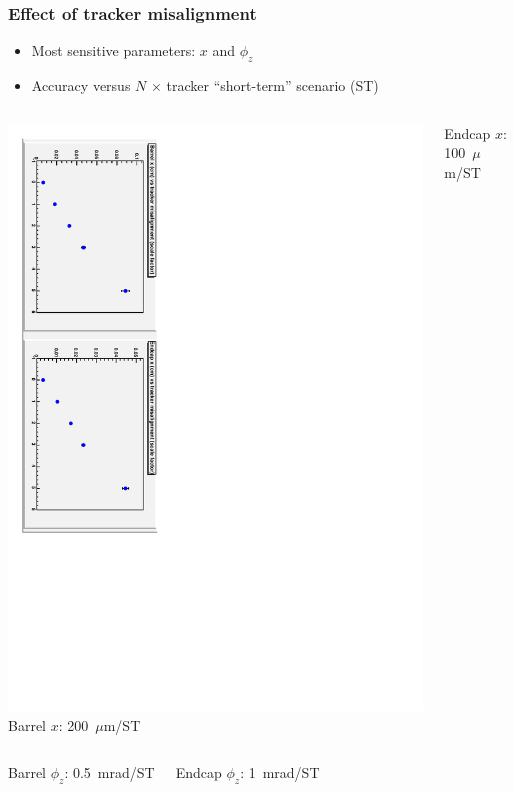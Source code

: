 \documentclass[compress]{beamer}
\begin{document}
\begin{frame}
\frametitle{Effect of tracker misalignment}
\begin{itemize}
\item Most sensitive parameters: $x$ and $\phi_z$
\item Accuracy versus $N$ $\times$ tracker ``short-term'' scenario (ST)
\end{itemize}

\begin{columns}
\includegraphics[height=\linewidth, angle=90]{tracker_x_rmsonly.pdf}
Barrel $x$: 200~$\mu$m/ST

\vspace{0.1 cm}
Endcap $x$: 100~$\mu$m/ST
\end{columns}

\vfill
\begin{columns}
Barrel $\phi_z$: 0.5~mrad/ST

\vspace{0.1 cm}
Endcap $\phi_z$: 1~mrad/ST


\end{columns}
\end{frame}
\end{document}
